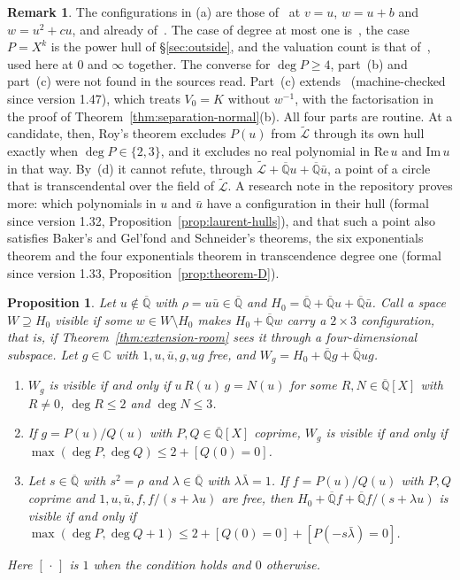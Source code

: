 \documentclass[11pt,a4paper]{article}
\theoremstyle{plain}
\newtheorem{proposition}[theorem]{Proposition}
\theoremstyle{definition}
\newtheorem{remark}[theorem]{Remark}
\newcommand{\C}{\mathbb{C}}
\newcommand{\Alg}{\overline{\mathbb{Q}}}
\newcommand{\aLogs}{\widetilde{\mathcal{L}}}
\begin{document}
\begin{remark}\label{rem:polynomial-hull-credit}
The configurations in (a) are those of~\cite[Th\'eor\`eme~7(1)]{diaz-2007} at $v=u$, $w=u+b$ and $w=u^{2}+cu$, and
already of~\cite[Th\'eor\`eme~2]{diaz-2004}. The case of degree at most one is~\cite[Theorem~3.4]{roy-1995}, the case
$P=X^{k}$ is the power hull of \S\ref{sec:outside}, and the valuation count is that of~\cite[\S7]{bachoc-serra-zemor},
used here at $0$ and $\infty$ together. The converse for $\deg P\ge4$, part~(b) and part~(c) were not found in the
sources read. Part~(c) extends~\cite[Proposition~12.2]{waldschmidt-book} (machine-checked since version 1.47), which
treats $V_{0}=K$ without $w^{-1}$, with
the factorisation in the proof of Theorem~\ref{thm:separation-normal}(b). All four parts are routine. At a candidate,
then, Roy's theorem excludes $P(u)$ from $\aLogs$ through its own hull exactly when $\deg P\in\{2,3\}$, and it excludes
no real polynomial in $\mathrm{Re}\,u$ and $\mathrm{Im}\,u$ in that way. By~(d) it cannot refute, through
$\aLogs+\Alg u+\Alg\bar u$, a point of a circle that is transcendental over the field of $\aLogs$. A research note in the
repository proves more: which polynomials in $u$ and $\bar u$ have a configuration in their hull (formal since
version 1.32, Proposition~\ref{prop:laurent-hulls}), and that such a point also satisfies Baker's and Gel'fond and Schneider's theorems, the six exponentials theorem and the
four exponentials theorem in transcendence degree one (formal since version 1.33,
Proposition~\ref{prop:theorem-D}).
\end{remark}

\begin{proposition}\label{prop:degree-one-visibility}
Let $u\notin\Alg$ with $\rho=u\bar u\in\Alg$ and $H_{0}=\Alg+\Alg u+\Alg\bar u$. Call a space $W\supseteq H_{0}$
\emph{visible} if some $w\in W\setminus H_{0}$ makes $H_{0}+\Alg w$ carry a $2\times3$ configuration, that is, if
Theorem~\ref{thm:extension-room} sees it through a four-dimensional subspace. Let $g\in\C$ with $1,u,\bar u,g,ug$ free,
and $W_{g}=H_{0}+\Alg g+\Alg ug$.
\begin{enumerate}[label=\textup{(\alph*)}]
\item $W_{g}$ is visible if and only if $u\,R(u)\,g=N(u)$ for some $R,N\in\Alg[X]$ with $R\neq0$, $\deg R\leq2$ and
$\deg N\leq3$.
\item If $g=P(u)/Q(u)$ with $P,Q\in\Alg[X]$ coprime, $W_{g}$ is visible if and only if
$\max(\deg P,\deg Q)\leq2+[Q(0)=0]$.
\item Let $s\in\Alg$ with $s^{2}=\rho$ and $\lambda\in\Alg$ with $\lambda\bar\lambda=1$. If $f=P(u)/Q(u)$ with $P,Q$
coprime and $1,u,\bar u,f,f/(s+\lambda u)$ are free, then $H_{0}+\Alg f+\Alg f/(s+\lambda u)$ is visible if and only if
$\max(\deg P,\deg Q+1)\leq2+[Q(0)=0]+[P(-s\bar\lambda)=0]$.
\end{enumerate}
Here $[\,\cdot\,]$ is $1$ when the condition holds and $0$ otherwise.
\end{proposition}
\end{document}
